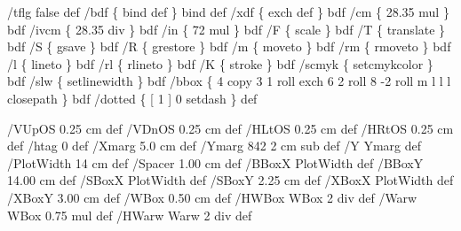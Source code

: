 \documentclass[11pt]{article}
\def\nwendcode{\endtrivlist \endgroup} %
\let\nwdocspar=\par                    %
\begin{document}
\newpage



\nwenddocs{}\endmoddef
%
/tflg false def %
/bdf \{ bind def \} bind def
/xdf \{ exch def \} bdf
/cm \{ 28.35 mul \} bdf
/ivcm \{ 28.35 div \} bdf
/in \{ 72    mul \} bdf
/F \{ scale \} bdf
/T \{ translate \} bdf
/S \{ gsave \} bdf
/R \{ grestore \} bdf
/m \{ moveto \} bdf
/rm \{ rmoveto \} bdf
/l \{ lineto \} bdf
/rl \{ rlineto \} bdf
/K \{ stroke \} bdf
/scmyk \{ setcmykcolor \} bdf
/slw \{ setlinewidth \} bdf
/bbox \{ 4 copy 3 1 roll exch 6 2 roll 8 -2 roll m l l l closepath \} bdf
/dotted \{ [ 1 ] 0 setdash \} def
%
%
\nwendcode{}\nwdocspar


\nwenddocs{}\endmoddef
%
/VUpOS 0.25 cm def  %
/VDnOS 0.25 cm def  %
/HLtOS 0.25 cm def
/HRtOS 0.25 cm def
/htag   0 def
/Xmarg  5.0 cm def       %
/Ymarg  842 2 cm sub def
/Y Ymarg def
/PlotWidth  14 cm def    %
/Spacer   1.00 cm def    %
/BBoxX  PlotWidth def    %
/BBoxY   14.00 cm def    %
/SBoxX  PlotWidth def
/SBoxY    2.25 cm def
/XBoxX  PlotWidth def
/XBoxY    3.00 cm def
/WBox     0.50 cm def    %
/HWBox WBox 2 div    def
/Warw  WBox 0.75 mul def
/HWarw Warw 2 div    def
%
%
\nwendcode{}\nwdocspar

\end{document}
